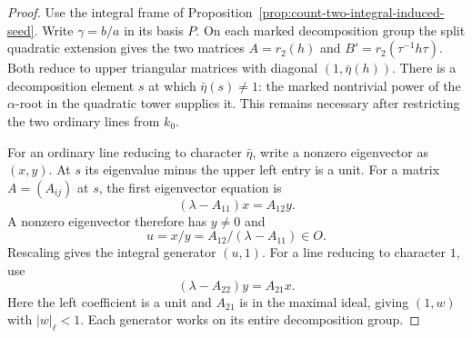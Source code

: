 \begin{proof}

Use the integral frame of Proposition~\ref{prop:count-two-integral-induced-seed}.
Write \(\gamma=b/a\) in its basis \(P\). On each
marked decomposition group the split quadratic extension
gives the two matrices \(A=r_2(h)\) and
\(B'=r_2(\tau^{-1}h\tau)\). Both reduce to upper triangular
matrices with diagonal \((1,\bar\eta(h))\). There is a
decomposition element \(s\) at which \(\bar\eta(s)\ne1\):
the marked nontrivial power of the \(\alpha\)-root in the
quadratic tower supplies it. This remains necessary after
restricting the two ordinary lines from \(k_0\).

For an ordinary line reducing to character \(\bar\eta\),
write a nonzero eigenvector as \((x,y)\). At \(s\) its
eigenvalue minus the upper left entry is a unit. For a matrix \(A=(A_{ij})\) at \(s\), the first eigenvector
equation is
\[
 (\lambda-A_{11})x=A_{12}y.
\]
A nonzero eigenvector therefore has \(y\ne0\) and
\[
 u=x/y=A_{12}/(\lambda-A_{11})\in O .
\]
Rescaling gives the integral generator \((u,1)\).
For a line reducing to character \(1\), use
\[
        (\lambda-A_{22})y=A_{21}x .
\]
Here the left coefficient is a unit and \(A_{21}\) is in the
maximal ideal, giving \((1,w)\) with \(|w|_\ell<1\). Each generator works
on its entire decomposition group.


\end{proof}
